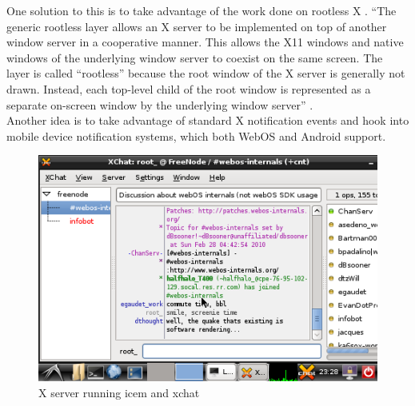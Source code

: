One solution to this is to take advantage of the work done on rootless X \cite{rootless}.  ``The generic rootless layer allows an X server to be implemented on top of another window server in a cooperative manner. This allows the X11 windows and native windows of the underlying window server to coexist on the same screen. The layer is called ``rootless'' because the root window of the X server is generally not drawn. Instead, each top-level child of the root window is represented as a separate on-screen window by the underlying window server'' \cite{rootless}.\\

Another idea is to take advantage of standard X notification events \cite{notifications} and hook into mobile device notification systems, which both WebOS and Android support. \\

\begin{figure}[tbh]
\centering
\includegraphics[width=1.0\columnwidth]{xchat1}
\caption{X server running icem and xchat}
\label{fig:x_screenie}
\end{figure}
